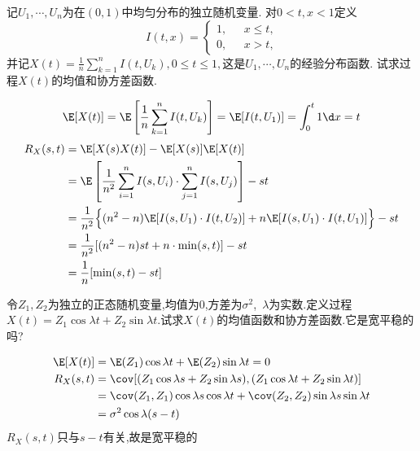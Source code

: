 \begin{problem}{1.2}
记$U_1, \cdots, U_n$为在$(0,1)$中均匀分布的独立随机变量. 对$0<t,x<1$定义
\[ I(t,x) =
	\begin{cases}
		1, & \text{ $x \leqslant t$,} \\
		0, & \text{ $x > t$,}
	\end{cases}
\]
并记$\displaystyle X(t) = \frac{1}{n}\sum^n_{k=1}I(t,U_k), 0 \leqslant t \leqslant 1, $这是$U_1, \cdots, U_n$的经验分布函数. 试求过程$X(t)$的均值和协方差函数.
\end{problem}
\begin{solution}
	\[\E[X(t)] = \E\left[\frac{1}{n}\sum^n_{k=1}I(t, U_k)\right] = \E[I(t, U_1)] = \int^t_0 1 \d x = t\]
	\[\begin{aligned}
			R_X(s, t) & = \E [X(s)X(t)] - \E[X(s)]\E[X(t)]                                                                      \\
			          & = \E\left[\frac{1}{n^2}\sum_{i=1}^n I(s, U_i) \cdot \sum_{j=1}^n I(s, U_j)\right] - st                  \\
			          & = \frac{1}{n^2}\Big\{(n^2 - n)\E[I(s, U_1) \cdot I(t, U_2)] + n\E[I(s, U_1) \cdot I(t, U_1)]\Big\} - st \\
			          & = \frac{1}{n^2}[(n^2 - n)st + n \cdot \min(s, t)] - st                                                  \\
			          & = \frac{1}{n}[\min(s, t) - st]
		\end{aligned}\]
\end{solution}

\begin{problem}{1.3}
令$Z_1, Z_2$为独立的正态随机变量,均值为$0$,方差为$\sigma^2$,~$\lambda$为实数.定义过程$X(t) = Z_1\cos\lambda t + Z_2\sin\lambda t$.试求$X(t)$的均值函数和协方差函数.它是宽平稳的吗?
\end{problem}
\begin{solution}
	\[\begin{aligned}
			\E[X(t)]  & = \E(Z_1)\cos \lambda t + \E(Z_2)\sin\lambda t = 0                                      \\
			R_X(s, t) & = \cov[(Z_1\cos\lambda s + Z_2\sin\lambda s), (Z_1\cos\lambda t + Z_2\sin\lambda t)]    \\
			          & = \cov(Z_1, Z_1)\cos\lambda s \cos\lambda t + \cov(Z_2, Z_2)\sin\lambda s \sin\lambda t \\
			          & = \sigma^2\cos\lambda(s - t)                                                            \\
		\end{aligned}\]
	$R_X(s,t)$只与$s-t$有关,故是宽平稳的
\end{solution}

